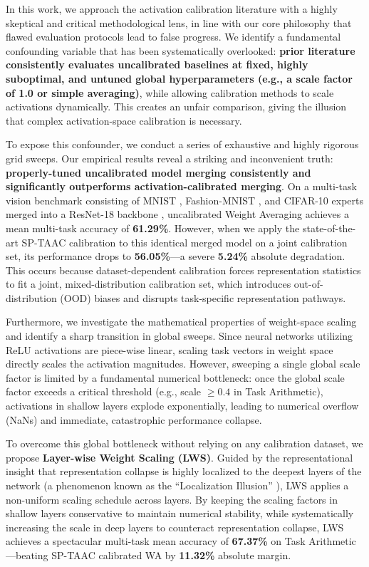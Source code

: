 \documentclass{article}
\theoremstyle{plain}
\theoremstyle{definition}
\theoremstyle{remark}
\begin{document}
In this work, we approach the activation calibration literature with a highly skeptical and critical methodological lens, in line with our core philosophy that flawed evaluation protocols lead to false progress. We identify a fundamental confounding variable that has been systematically overlooked: \textbf{prior literature consistently evaluates uncalibrated baselines at fixed, highly suboptimal, and untuned global hyperparameters (e.g., a scale factor of 1.0 or simple averaging)}, while allowing calibration methods to scale activations dynamically. This creates an unfair comparison, giving the illusion that complex activation-space calibration is necessary.

To expose this confounder, we conduct a series of exhaustive and highly rigorous grid sweeps. Our empirical results reveal a striking and inconvenient truth: \textbf{properly-tuned uncalibrated model merging consistently and significantly outperforms activation-calibrated merging}. On a multi-task vision benchmark consisting of MNIST \cite{mnist}, Fashion-MNIST \cite{fashion_mnist}, and CIFAR-10 \cite{cifar10} experts merged into a ResNet-18 backbone \cite{resnet}, uncalibrated Weight Averaging achieves a mean multi-task accuracy of \textbf{61.29\%}. However, when we apply the state-of-the-art SP-TAAC calibration \cite{sp_taac} to this identical merged model on a joint calibration set, its performance drops to \textbf{56.05\%}—a severe \textbf{5.24\%} absolute degradation. This occurs because dataset-dependent calibration forces representation statistics to fit a joint, mixed-distribution calibration set, which introduces out-of-distribution (OOD) biases and disrupts task-specific representation pathways.

Furthermore, we investigate the mathematical properties of weight-space scaling and identify a sharp transition in global sweeps. Since neural networks utilizing ReLU activations are piece-wise linear, scaling task vectors in weight space directly scales the activation magnitudes. However, sweeping a single global scale factor is limited by a fundamental numerical bottleneck: once the global scale factor exceeds a critical threshold (e.g., scale $\ge 0.4$ in Task Arithmetic), activations in shallow layers explode exponentially, leading to numerical overflow (NaNs) and immediate, catastrophic performance collapse.

To overcome this global bottleneck without relying on any calibration dataset, we propose \textbf{Layer-wise Weight Scaling (LWS)}. Guided by the representational insight that representation collapse is highly localized to the deepest layers of the network (a phenomenon known as the ``Localization Illusion'' \cite{deconstructing_cal}), LWS applies a non-uniform scaling schedule across layers. By keeping the scaling factors in shallow layers conservative to maintain numerical stability, while systematically increasing the scale in deep layers to counteract representation collapse, LWS achieves a spectacular multi-task mean accuracy of \textbf{67.37\%} on Task Arithmetic—beating SP-TAAC calibrated WA by \textbf{11.32\%} absolute margin.
\end{document}
